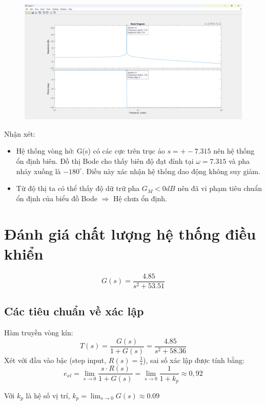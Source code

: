\begin{figure}[H]
    \centering
    \includegraphics[width=1\textwidth]{pictures/bode.png}
\end{figure}
Nhận xét:
\begin{itemize}
    \item Hệ thống vòng hở: G(s) có các cực trên trục ảo $s=+-7.315$ nên hệ thống ổn định biên. Đồ thị Bode cho thấy biên độ đạt đỉnh tại $\omega=7.315$ và pha nhảy xuống là $-180^\circ$. Điều này xác nhận hệ thống dao động không suy giảm.
    \item Từ độ thị ta có thể thấy độ dữ trữ pha $G_M < 0 dB$ nên đã vi phạm tiêu chuẩn ổn định của biểu đồ Bode $\Rightarrow$ Hệ chưa ổn định. 
\end{itemize}

\chapter{Đánh giá chất lượng hệ thống điều khiển}
\[
    G(s) = \frac{4.85}{s^2 + 53.51}
\]
\section{Các tiêu chuẩn về xác lập}
Hàm truyền vòng kín:
\[
    T(s) = \frac{G(s)}{1+G(s)} = \frac{4.85}{s^2 + 58.36}
\]
Xét với đầu vào bậc (step input, $R(s)=\frac{1}{s}$), sai số xác lập được tính bằng:
\[
e_{xl} = \lim_{s \to 0} \frac{s \cdot R(s)}{1 + G(s)} 
= \lim_{s \to 0} \frac{1}{1 + k_p} \approx 0{,}92
\]
\begin{center}
    Với $k_p$  là hệ số vị trí, $k_p = \lim_{s \to 0} G(s) \approx 0.09$ 
\end{center}